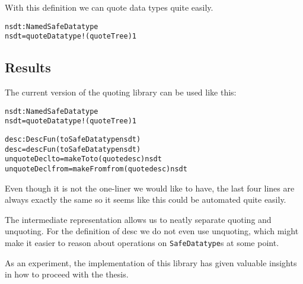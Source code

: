 With this definition we can quote data types quite easily.

\begin{alltt}
nsdt : NamedSafeDatatype
nsdt = quoteDatatype! (quote Tree) 1
\end{alltt}

\subsection{Results}\label{sec:prototype-results}

The current version of the quoting library can be used like this:

\begin{alltt}
nsdt : NamedSafeDatatype
nsdt = quoteDatatype! (quote Tree) 1

desc : DescFun (toSafeDatatype nsdt)
desc = descFun (toSafeDatatype nsdt)
unquoteDecl to = makeTo to (quote desc) nsdt
unquoteDecl from = makeFrom from (quote desc) nsdt
\end{alltt}

Even though it is not the one-liner we would like to have, the last
four lines are always exactly the same so it seems like this could be
automated quite easily.

The intermediate representation allows us to neatly separate quoting
and unquoting.
For the definition of desc we do not even use unquoting, which might
make it easier to reason about operations on \texttt{SafeDatatype}s at
some point. 

As an experiment, the implementation of this library has given
valuable insights in how to proceed with the thesis.
